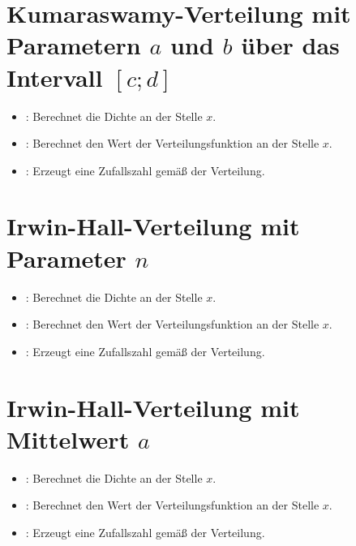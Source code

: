 \section{Kumaraswamy-Verteilung mit Parametern \texorpdfstring{$a$}{a} und \texorpdfstring{$b$}{b} über das Intervall \texorpdfstring{$[c;d]$}{[c;d]}}

\begin{itemize}

\item
{}:
Berechnet die Dichte an der Stelle $x$.

\item
{}:
Berechnet den Wert der Verteilungsfunktion an der Stelle $x$.

\item
{}:
Erzeugt eine Zufallszahl gemäß der Verteilung.

\end{itemize}



\section{Irwin-Hall-Verteilung mit Parameter \texorpdfstring{$n$}{n}}

\begin{itemize}

\item
{}:
Berechnet die Dichte an der Stelle $x$.

\item
{}:
Berechnet den Wert der Verteilungsfunktion an der Stelle $x$.

\item
{}:
Erzeugt eine Zufallszahl gemäß der Verteilung.

\end{itemize}



\section{Irwin-Hall-Verteilung mit Mittelwert \texorpdfstring{$a$}{n}}

\begin{itemize}

\item
{}:
Berechnet die Dichte an der Stelle $x$.

\item
{}:
Berechnet den Wert der Verteilungsfunktion an der Stelle $x$.

\item
{}:
Erzeugt eine Zufallszahl gemäß der Verteilung.

\end{itemize}



